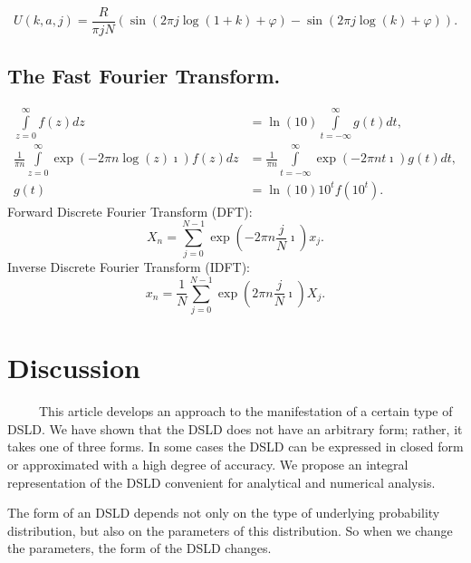 \documentclass[titlepage,fleqn]{article}%
\begin{document}
\[
U(k,a,j)=\frac{R}{\pi jN}\left(  \sin\left(  2\pi j\log\left(  1+k\right)
+\varphi\right)  -\sin\left(  2\pi j\log\left(  k\right)  +\varphi\right)
\right)  .
\]


\subsection{The Fast Fourier Transform.}%

\begin{align*}%
{\displaystyle\int\limits_{z=0}^{\infty}}
f(z)dz  &  =\ln(10)%
{\displaystyle\int\limits_{t=-\infty}^{\infty}}
g(t)dt,\\
\frac{1}{\pi n}%
{\displaystyle\int\limits_{z=0}^{\infty}}
\exp(-2\pi n\log(z)\imath)f(z)dz  &  =\frac{1}{\pi n}%
{\displaystyle\int\limits_{t=-\infty}^{\infty}}
\exp(-2\pi nt\imath)g(t)dt,\\
g(t)  &  =\ln(10)10^{t}f(10^{t}).
\end{align*}
Forward Discrete Fourier Transform (DFT):%
\[
X_{n}=%
{\displaystyle\sum\limits_{j=0}^{N-1}}
\exp\left(  -2\pi n\frac{j}{N}\imath\right)  x_{j}.
\]
Inverse Discrete Fourier Transform (IDFT):%
\[
x_{n}=\frac{1}{N}%
{\displaystyle\sum\limits_{j=0}^{N-1}}
\exp\left(  2\pi n\frac{j}{N}\imath\right)  X_{j}.
\]


\section{Discussion}%

\label{Discussion}%


\ \ \ \ \ This article develops an approach to the manifestation of a certain
type of DSLD. We have shown that the DSLD does not have an arbitrary form;
rather, it takes one of three forms. In some cases the DSLD can be expressed
in closed form or approximated with a high degree of accuracy. We propose an
integral representation of the DSLD convenient for analytical and numerical analysis.

The form of an DSLD depends not only on the type of underlying probability
distribution, but also on the parameters of this distribution. So when we
change the parameters, the form of the DSLD changes.
\end{document}
